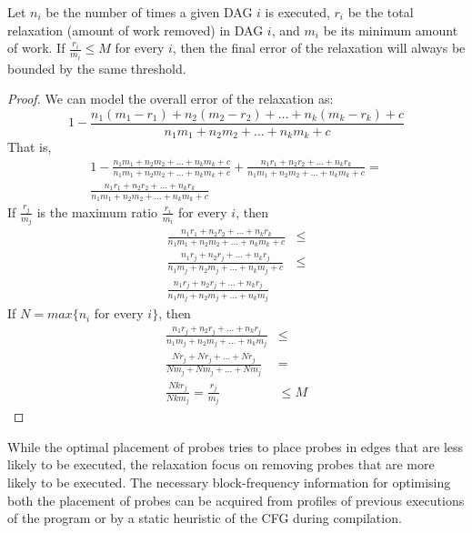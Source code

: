 \begin{prop}
Let $n_i$ be the number of times a given DAG $i$ is executed, $r_i$ be the total relaxation (amount of work removed) in DAG $i$, and $m_i$ be its minimum amount of work.
If $\frac{r_i}{m_i} \leq M$ for every $i$,
then the final error of the relaxation will always be bounded by the same threshold.
\end{prop}
\begin{proof}
We can model the overall error of the relaxation as:
\[
1 - \frac{n_1(m_1 - r_1) + n_2(m_2 - r_2) + \ldots + n_k(m_k - r_k) + c}{n_1m_1 + n_2m_2 + \ldots + n_km_k + c}
\]
That is,
\begin{gather*}
 1 - \frac{n_1m_1 + n_2m_2 + \ldots + n_km_k + c}{n_1m_1 + n_2m_2 + \ldots + n_km_k + c} + \frac{n_1r_1 + n_2r_2 + \ldots + n_kr_k}{n_1m_1 + n_2m_2 + \ldots + n_km_k + c} = \\
 \frac{n_1r_1 + n_2r_2 + \ldots + n_kr_k}{n_1m_1 + n_2m_2 + \ldots + n_km_k + c}
\end{gather*}
If $\frac{r_j}{m_j}$ is the maximum ratio $\frac{r_i}{m_i}$ for every $i$, then
\begin{equation*}
\begin{aligned}
 \frac{n_1r_1 + n_2r_2 + \ldots + n_kr_k}{n_1m_1 + n_2m_2 + \ldots + n_km_k + c} &\leq\\
 \frac{n_1r_j + n_2r_j + \ldots + n_kr_j}{n_1m_j + n_2m_j + \ldots + n_km_j + c} &\leq\\
 \frac{n_1r_j + n_2r_j + \ldots + n_kr_j}{n_1m_j + n_2m_j + \ldots + n_km_j} & 
\end{aligned}
\end{equation*}
If $N = max\{n_i$ for every $i\}$, then
\begin{equation*}
\begin{aligned}
 \frac{n_1r_j + n_2r_j + \ldots + n_kr_j}{n_1m_j + n_2m_j + \ldots + n_km_j} &\leq\\
 \frac{Nr_j + Nr_j + \ldots + Nr_j}{Nm_j + Nm_j + \ldots + Nm_j} &=\\
 \frac{Nkr_j}{Nkm_j} = \frac{r_j}{m_j} &\leq M
\end{aligned}
\end{equation*}
\end{proof}

While the optimal placement of probes tries to place probes in edges that are less likely to be executed, the relaxation focus on removing probes that are more likely to be executed.
The necessary block-frequency information for optimising both the placement of probes can be acquired from profiles of previous executions of the program or by a static heuristic of the CFG during compilation.


